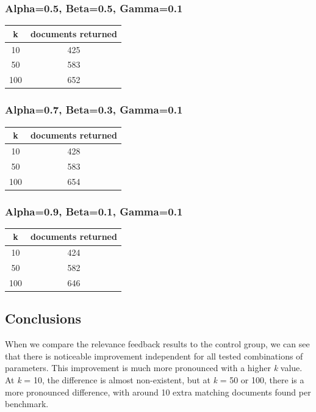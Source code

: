 \documentclass{article}
\begin{document}
\subsubsection{Alpha=0.5, Beta=0.5, Gamma=0.1}

\begin{center}
\begin{tabular}{|c|c|} \hline
\textbf{k} & \textbf{documents returned} \\ \hline
10 & 425\\
50 & 583\\
100 & 652\\ \hline
\end{tabular}
\end{center}

\subsubsection{Alpha=0.7, Beta=0.3, Gamma=0.1}

\begin{center}
\begin{tabular}{|c|c|} \hline
\textbf{k} & \textbf{documents returned} \\ \hline
10 & 428\\
50 & 583\\
100 & 654\\ \hline
\end{tabular}
\end{center}

\subsubsection{Alpha=0.9, Beta=0.1, Gamma=0.1}

\begin{center}
\begin{tabular}{|c|c|} \hline
\textbf{k} & \textbf{documents returned} \\ \hline
10 & 424\\
50 & 582\\
100 & 646\\ \hline
\end{tabular}
\end{center}

\subsection{Conclusions}
When we compare the relevance feedback results to the control group, we can see that there is noticeable improvement independent for all tested combinations of parameters. This improvement is much more pronounced with a higher \textit{k} value. At \textit{k} = 10, the difference is almost non-existent, but at \textit{k} = 50 or 100, there is a more pronounced difference, with around 10 extra matching documents found per benchmark.\\
\end{document}

